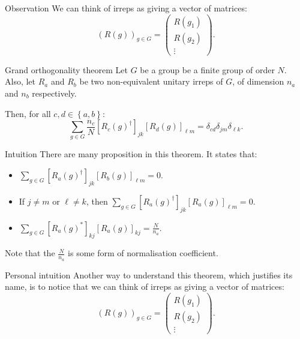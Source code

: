 \documentclass[a4paper]{article}
\begin{document}
\begin{parag}{Observation}
    We can think of irreps as giving a vector of matrices: 
    \[\left(R\left(g\right)\right)_{g \in G} = \begin{pmatrix} R\left(g_1\right) \\ R\left(g_2\right) \\ \vdots \end{pmatrix}.\]
\end{parag}

\begin{parag}{Grand orthogonality theorem}
    Let $G$ be a group be a finite group of order $N$. Also, let $R_a$ and $R_b$ be two non-equivalent unitary irreps of $G$, of dimension $n_a$ and $n_b$ respectively.

    Then, for all $c, d \in \left\{a, b\right\}$: 
    \[\sum_{g \in G} \frac{n_c}{N} \left[R_c\left(g\right)^{\dagger}\right]_{jk} \left[R_d\left(g\right)\right]_{\ell m} = \delta_{cd} \delta_{jm} \delta_{\ell k}.\]
     
    \begin{subparag}{Intuition}
        There are many proposition in this theorem. It states that: 
        \begin{itemize}
            \item $\displaystyle \sum_{g \in G} \left[R_a\left(g\right)^{\dagger}\right]_{jk} \left[R_b\left(g\right)\right]_{\ell m} = 0$.
            \item If $j \neq m$ or $\ell \neq k$, then $\displaystyle \sum_{g \in G} \left[R_a\left(g\right)^{\dagger}\right]_{jk} \left[R_a\left(g\right)\right]_{\ell m} = 0$.
            \item $\displaystyle \sum_{g \in G} \left[R_a\left(g\right)^{*}\right]_{kj} \left[R_a\left(g\right)\right]_{kj} = \frac{N}{n_a}$.
        \end{itemize}

        Note that the $\frac{N}{n_a}$ is some form of normalisation coefficient.
    \end{subparag}

    \begin{subparag}{Personal intuition}
        Another way to understand this theorem, which justifies its name, is to notice that we can think of irreps as giving a vector of matrices: 
        \[\left(R\left(g\right)\right)_{g \in G} = \begin{pmatrix} R\left(g_1\right) \\ R\left(g_2\right) \\ \vdots \end{pmatrix}.\]


\end{subparag}
\end{parag}
\end{document}
